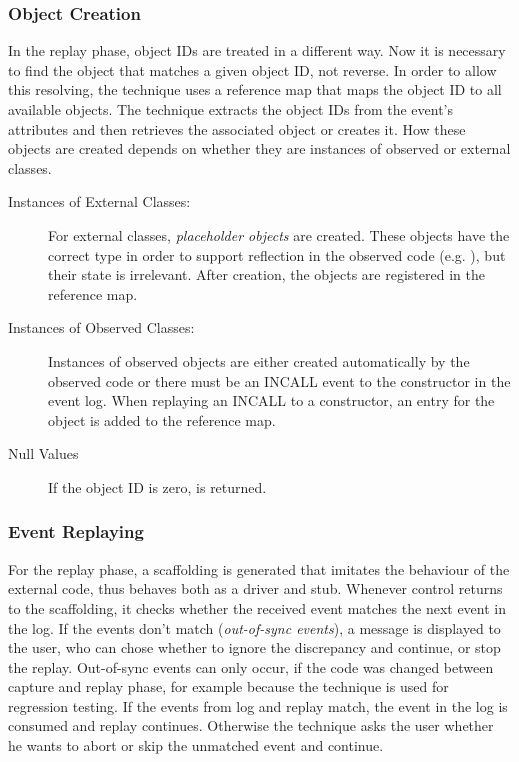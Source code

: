 \subsubsection{Object Creation}
In the replay phase, object IDs are treated in a different way. Now it is necessary to find the object that matches a given object ID, not reverse. In order to allow this resolving, the technique uses a reference map that maps the object ID to all available  objects. The technique extracts the object IDs from the event's attributes and then retrieves the associated object or creates it. How these objects are created depends on whether they are instances of observed or external classes.
\begin{description}
 \item [Instances of External Classes:] For external classes, \emph{placeholder objects} are created. These objects have the correct type in order to support reflection in the observed code (e.g. ), but their state is irrelevant. After creation, the objects are registered in the reference map.
 \item [Instances of Observed Classes:] Instances of observed objects are either created automatically by the observed code or there must be an INCALL event to the constructor in the event log. When replaying an INCALL to a constructor, an entry for the object is added to the reference map.
 \item [Null Values] If the object ID is zero,  is returned.
\end{description}

\subsubsection{Event Replaying}
For the replay phase, a scaffolding is generated that imitates the behaviour of the external code, thus behaves both as a driver and stub. Whenever control returns to the scaffolding, it checks whether the received event matches the next event in the log. If the events don't match (\emph{out-of-sync events}), a message is displayed to the user, who can chose whether to ignore the discrepancy and continue, or stop the replay.  Out-of-sync events can only occur, if the code was changed between capture and replay phase, for example because the technique is used for regression testing. If the events from log and replay match, the event in the log is  consumed and replay continues. Otherwise the technique asks the user whether he wants to abort or skip the unmatched event and continue.

